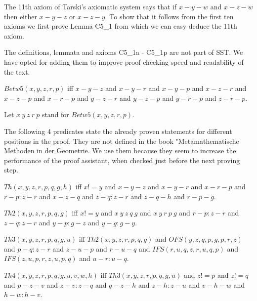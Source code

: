 \documentclass{article}
\begin{document}
  The 11th axiom of Tarski's axiomatic system says that if $x-y-w$ and $x-z-w$ then either $x-y-z$ or $x-z-y$. To show that it follows from the first ten axioms we first prove Lemma C5_1 from which we can easy deduce the 11th axiom.

  The definitions, lemmata and axioms C5_1a - C5_1p are not part of SST. We have opted for adding them to improve proof-checking speed and readability of the text.

  \begin{forthel}
    \begin{definition}[C5_1a]
      $Betw5(x,y,z,r,p)$ iff $x-y-z$ and $x-y-r$ and $x-y-p$ and $x-z-r$ and $x-z-p$ and $x-r-p$ and $y-z-r$ and $y-z-p$ and $y-r-p$ and $z-r-p$.
    \end{definition}

    Let $x~y~z~r~p$ stand for $Betw5(x,y,z,r,p)$.
  \end{forthel}

  The following 4 predicates state the already proven statements for different positions in the proof. They are not defined in the book "Metamathematische Methoden in der Geometrie. We use them because they seem to increase the performance of the proof assistant, when checked just before the next proving step.

  \begin{forthel}
    \begin{definition}[C5_1b]
      $Th(x,y,z,r,p,q,g,h)$ iff $x != y$ and $x-y-z$ and $x-y-r$ and $x-r-p$ and $r-p : z-r$ and $x-z-q$ and $z-q : z-r$ and $z-q-h$ and $r-p-g$.
    \end{definition}

    \begin{definition}[C5_1c]
      $Th2(x,y,z,r,p,q,g)$ iff $x != y$ and $x~y~z~q~g$ and $x~y~r~p~g$ and $r-p : z-r$ and $z-q : z-r$ and $y-p : g-z$ and $y-g : g-y$.
    \end{definition}

    \begin{definition}[C5_1d]
      $Th3(x,y,z,r,p,q,g,u)$ iff $Th2(x,y,z,r,p,q,g)$ and $OFS(y,z,q,p,g,p,r,z)$ and $p-q : z-r$ and $z-u-p$ and $r-u-q$ and $IFS(r,u,q,z,r,u,q,p)$ and $IFS(z,u,p,r,z,u,p,q)$ and $u-r : u-q$.
    \end{definition}

    \begin{definition}[C5_1e]
      $Th4(x,y,z,r,p,q,g,u,v,w,h)$ iff $Th3(x,y,z,r,p,q,g,u)$ and $z != p$ and $z != q$ and $p-z-v$ and $z-v : z-q$ and $q-z-h$ and $z-h : z-u$ and $v-h-w$ and $h-w : h-v$.
    \end{definition}
  \end{forthel}
\end{document}
